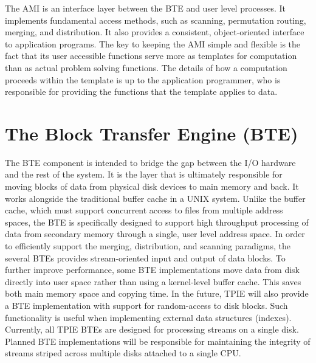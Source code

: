 
The AMI is an interface layer between the BTE and user
level processes.  It implements fundamental access methods, such as
scanning, permutation routing, merging, and distribution. It also provides
a consistent, object-oriented interface to application programs.
The key to keeping the AMI simple and flexible is the fact that its
user accessible functions serve more as templates for computation than
as actual problem solving functions.  The details of how a computation
proceeds within the template is up to the application programmer, who
is responsible for providing the functions that the template applies
to data.

\section{The Block Transfer Engine (BTE)}
\label{sec:ref-bte}

\tobeextended 

The BTE component is intended to bridge the gap between the
I/O hardware and the rest of the system. It is the layer
that is ultimately responsible for moving blocks of data
from physical disk devices to main memory and back. It works
alongside the traditional buffer cache
in a UNIX system.  Unlike the buffer cache, which must
support concurrent access to files from multiple address
spaces, the BTE is specifically designed to support high
throughput processing of data from secondary memory through
a single, user level address space.  In order to efficiently
support the merging, distribution, and scanning paradigms,
the several BTEs provides stream-oriented input and output
of data blocks.  To further improve performance, some BTE
implementations move data from disk directly into user space
rather than using a kernel-level 
buffer cache. 
 This saves both main memory space and copying
time. In the future, TPIE will also provide a BTE
implementation with support for random-access to disk
blocks. Such functionality is useful when implementing
external data structures (indexes).  Currently, all TPIE
BTEs are designed for processing streams on a single disk.
Planned BTE implementations will be responsible for
maintaining the integrity of streams striped across multiple
disks attached to a single CPU.

